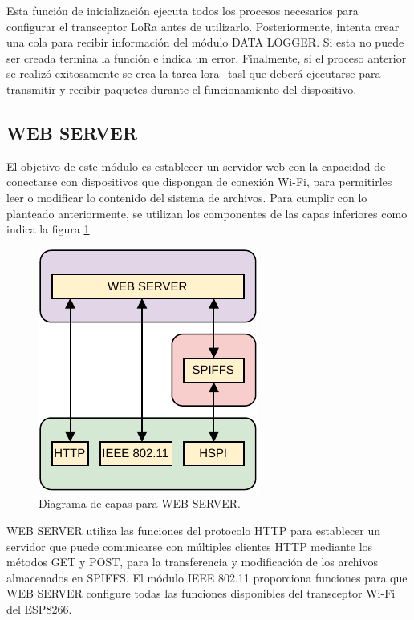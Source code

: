 Esta función de inicialización ejecuta todos los procesos necesarios para configurar el transceptor LoRa antes de utilizarlo. Posteriormente, intenta crear una cola para recibir información del módulo DATA LOGGER. Si esta no puede ser creada termina la función e indica un error. Finalmente, si el proceso anterior se realizó exitosamente se crea la tarea lora\_tasl que deberá ejecutarse para transmitir y recibir paquetes durante el funcionamiento del dispositivo. 

\subsection{WEB SERVER}

El objetivo de este módulo es establecer un servidor web con la capacidad de conectarse con dispositivos que dispongan de conexión Wi-Fi, para permitirles leer o modificar lo contenido del sistema de archivos. Para cumplir con lo planteado anteriormente, se utilizan los componentes de las capas inferiores como indica la figura \ref{fig:serverDiagram}.

\begin{figure}[h]
	\centering
	\includegraphics[scale=1]{./Figures/web_server_diagram.pdf}
	\caption{Diagrama de capas para WEB SERVER.}
		\label{fig:serverDiagram}
\end{figure}

WEB SERVER utiliza las funciones del protocolo HTTP para establecer un servidor que puede comunicarse con múltiples clientes HTTP mediante los métodos GET y POST, para la transferencia y modificación de los archivos almacenados en SPIFFS. El módulo IEEE 802.11 proporciona funciones para que WEB SERVER configure todas las funciones disponibles del transceptor Wi-Fi del ESP8266.

